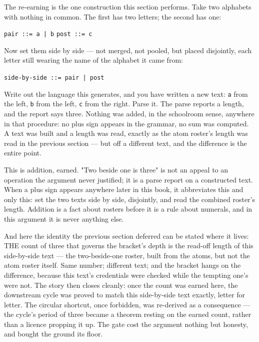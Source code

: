 The re-earning is the one construction this section performs. Take two alphabets with
nothing in common. The first has two letters; the second has one:

\begin{center}
\texttt{pair ::= a | b} \qquad \texttt{post ::= c}
\end{center}

Now set them side by side --- not merged, not pooled, but placed disjointly, each letter
still wearing the name of the alphabet it came from:

\begin{center}
\texttt{side-by-side ::= pair | post}
\end{center}

Write out the language this generates, and you have written a new text: \texttt{a} from
the left, \texttt{b} from the left, \texttt{c} from the right. Parse it. The parse
reports a length, and the report says three. Nothing was added, in the schoolroom sense,
anywhere in that procedure: no plus sign appears in the grammar, no sum was computed.
A text was built and a length was read, exactly as the atom roster's length was read in
the previous section --- but off a different text, and the difference is the entire
point.

This is addition, earned. "Two beside one is three" is not an appeal to an operation
the argument never justified; it is a parse report on a constructed text. When a plus
sign appears anywhere later in this book, it abbreviates this and only this: set the two
texts side by side, disjointly, and read the combined roster's length. Addition is a
fact about rosters before it is a rule about numerals, and in this argument it is never
anything else.

And here the identity the previous section deferred can be stated where it lives: THE
count of three that governs the bracket's depth is the read-off length of this
side-by-side text --- the two-beside-one roster, built from the atoms, but not the atom
roster itself. Same number; different text; and the bracket hangs on the difference,
because this text's credentials were checked while the tempting one's were not. The
story then closes cleanly: once the count was earned here, the downstream cycle was
proved to match this side-by-side text exactly, letter for letter. The circular
shortcut, once forbidden, was re-derived as a consequence --- the cycle's period of
three became a theorem resting on the earned count, rather than a licence propping it
up. The gate cost the argument nothing but honesty, and bought the ground its floor.

